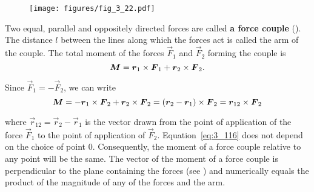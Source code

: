 \begin{figure}[t]
	\begin{center}
		\texttt{[image: figures/fig\_3\_22.pdf]}
		\caption[]{}
		\label{fig:3_22}
	\end{center}
	\vspace{-0.75cm}
\end{figure}

Two equal, parallel and oppositely directed forces are called \textbf{a force couple} (). The distance $l$ between the lines along which the forces act is called the arm of the couple. The total moment of the forces $\vec{F}_1$ and $\vec{F}_2$ forming the couple is
\begin{equation*}
\boldsymbol{M} = \boldsymbol{r}_{1}\times\boldsymbol{F}_{1} + \boldsymbol{r}_{2}\times\boldsymbol{F}_{2}.
\end{equation*}

\noindent
Since $\vec{F}_1=-\vec{F}_2$, we can write
\begin{equation}\label{eq:3_116}
\boldsymbol{M} = -\boldsymbol{r}_{1}\times\boldsymbol{F}_{2} + \boldsymbol{r}_{2}\times\boldsymbol{F}_{2} = (\boldsymbol{r}_2 - \boldsymbol{r}_1)\times\boldsymbol{F}_2 = \boldsymbol{r}_{12}\times\boldsymbol{F}_{2}
\end{equation}

\noindent
where $\vec{r}_{12}=\vec{r}_2-\vec{r}_1$ is the vector drawn from the point of application of the force $\vec{F}_1$ to the point of application of $\vec{F}_2$. Equation~\eqref{eq:3_116} does not depend on the choice of point $0$. Consequently, the moment of a force couple relative to any point will be the same. The vector of the moment of a force couple is perpendicular to the plane containing the forces (see ) and numerically equals the product of the magnitude of any of the forces and the arm.


